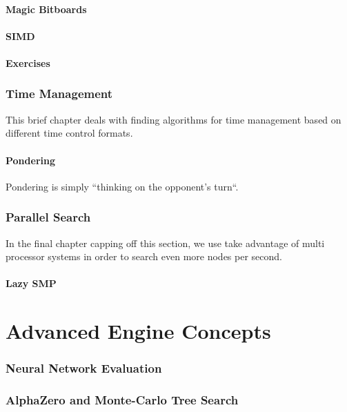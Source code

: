 \documentclass[letterpaper,11pt]{article}
\begin{document}
\subsection{Magic Bitboards}
\subsection{SIMD}
\subsection{Exercises}

\section{Time Management}

This brief chapter deals with finding algorithms for time management based on different time control formats.

\subsection{Pondering}

Pondering is simply ``thinking on the opponent's turn``.

\section{Parallel Search}

In the final chapter capping off this section, we use take advantage of multi processor systems in order to 
search even more nodes per second.

\subsection{Lazy SMP}

\newpage
\part{Advanced Engine Concepts}

\section{Neural Network Evaluation}

\section{AlphaZero and Monte-Carlo Tree Search}
\end{document}
